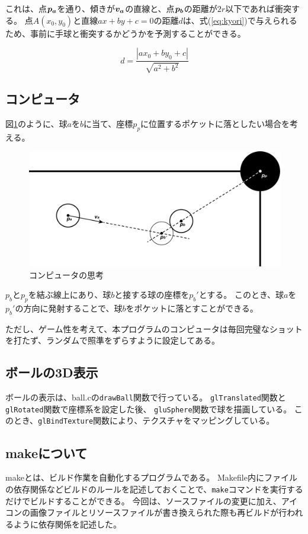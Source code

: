 \documentclass[a4j,titlepage]{jsarticle}
\newcommand{\bvec}[1]{\mbox{\boldmath $#1$}}
\begin{document}
これは、点$\bvec{p_a}$を通り、傾きが$\bvec{v_a}$の直線と、点$\bvec{p_b}$の距離が$2r$以下であれば衝突する。
点$A(x_0, y_0)$と直線$ax + by + c = 0$の距離$d$は、式(\ref{eq:kyori})で与えられるため、事前に手球と衝突するかどうかを予測することができる。

\begin{equation}
  d = \frac{| ax_0 + by_0 + c |}{\sqrt{a^2 + b^2}}
  \label{eq:kyori}
\end{equation}

\subsection{コンピュータ}
図\ref{fig:com}のように、球$a$を$b$に当て、座標$p_p$に位置するポケットに落としたい場合を考える。

\begin{figure}[H]
  \centering
  \includegraphics[width=14cm]{コンピュータ.pdf}
  \caption{コンピュータの思考}
  \label{fig:com}
\end{figure}

$p_b$と$p_p$を結ぶ線上にあり、球$b$と接する球の座標を$p_b'$とする。
このとき、球$a$を$p_b'$の方向に発射することで、球$b$をポケットに落とすことができる。

ただし、ゲーム性を考えて、本プログラムのコンピュータは毎回完璧なショットを打たず、ランダムで照準をずらすように設定してある。

\subsection{ボールの3D表示}
ボールの表示は、ball.cの\texttt{drawBall}関数で行っている。
\texttt{glTranslated}関数と\texttt{glRotated}関数で座標系を設定した後、
\texttt{gluSphere}関数で球を描画している。
このとき、\texttt{glBindTexture}関数により、テクスチャをマッピングしている。

\subsection{makeについて}
makeとは、ビルド作業を自動化するプログラムである。
Makefile内にファイルの依存関係などビルドのルールを記述しておくことで、\texttt{make}コマンドを実行するだけでビルドすることができる。
今回は、ソースファイルの変更に加え、アイコンの画像ファイルとリソースファイルが書き換えられた際も再ビルドが行われるように依存関係を記述した。
\end{document}
